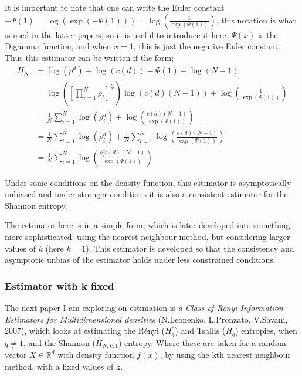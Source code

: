 \documentclass{report}
\begin{document}
It is important to note that one can write the Euler constant $-\Psi(1) = \log (\exp(-\Psi(1))) = \log (\frac{1}{\exp(\Psi(1))})$, this notation is what is used in the latter papers, so it is useful to introduce it here. $\Psi(x)$ is the Digamma function, and when $x=1$, this is just the negative Euler constant. Thus this estimator can be written if the form;
\begin{align}
H_{N} &= \log(\bar{\rho}^{d} ) + \log (c(d)) - \Psi(1)  + \log (N-1) \nonumber \\
&= \log \left( \left[ \prod_{i=1}^{N} \rho_{i} \right]^{\frac{d}{N}} \right) \log( c(d) (N-1)) + \log \left(\frac{1}{\exp(\Psi(1))}\right) \nonumber \\
&= \frac{1}{N} \sum_{i=1}^{N} \log( \rho_{i}^{d} ) + \log \left( \frac{c(d) (N-1)}{ \exp(\Psi(1))} \right) \nonumber \\
&= \frac{1}{N} \sum_{i=1}^{N}\log(\rho_{i}^{d}) + \frac{1}{N} \sum_{i=1}^{N} \log \left( \frac{c(d) (N-1)}{\exp(\Psi(1))}\right) \nonumber \\
&= \frac{1}{N} \sum_{i=1}^{N} \log \left( \frac{\rho_{i}^{d} c(d) (N-1)}{\exp(\Psi(1))}\right) \label{Est_k=1}
\end{align}

Under some conditions on the density function, this estimator is asymptotically unbiased and under stronger conditions it is also a consistent estimator for the Shannon entropy. 

The estimator here is in a simple form, which is later developed into something more sophisticated, using the nearest neighbour method, but considering larger values of $k$ (here $k=1$). This estimator is developed so that the consistency and asymptotic unbias of the estimator holds under less constrained conditions.



\subsubsection{Estimator with k fixed} \label{fixed_k}

The next paper I am exploring on estimation is \textit{a Class of Renyi Information Estimators for Multidimensional densities} (N.Leonenko, L.Pronzato, V.Savani, 2007), which looks at estimating the R\'enyi ($H_{q}^{*}$) and Tsallis ($H_{q}$) entropies, when $q \neq 1$, and the Shannon ($\hat{H}_{N, k, 1}$) entropy. Where these are taken for a random vector $X \in \mathbb{R}^d$ with density function $f(x)$, by using the kth nearest neighbour method, with a fixed values of k. 
\end{document}

